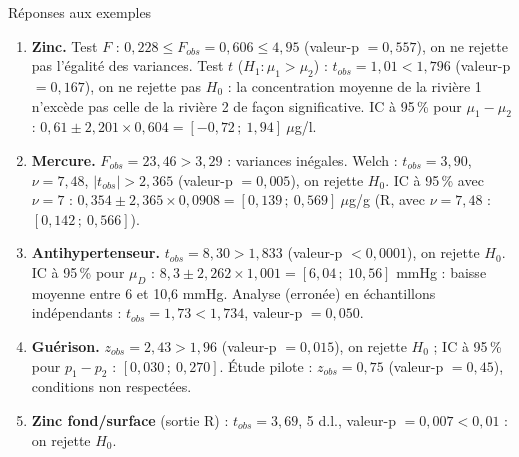 \documentclass{BeamerTemplate}
\begin{document}
\begin{frame}[t]{Réponses aux exemples}
  \footnotesize
  \begin{enumerate}\itemsep 1.5mm
    \item[1.] \textbf{Zinc.} Test $F$ : $0{,}228 \le F_{obs} = 0{,}606 \le 4{,}95$ (valeur-p $= 0{,}557$), on ne rejette pas l'égalité des variances.
      Test $t$ ($H_1: \mu_1 > \mu_2$) : $t_{obs} = 1{,}01 < 1{,}796$ (valeur-p $= 0{,}167$), on ne rejette pas $H_0$ : la concentration moyenne de la rivière 1 n'excède pas celle de la rivière 2 de façon significative.
      IC à 95\,\% pour $\mu_1 - \mu_2$ : $0{,}61 \pm 2{,}201 \times 0{,}604 = [-0{,}72\,;\ 1{,}94]\ \mu$g/l.
    \item[2.] \textbf{Mercure.} $F_{obs} = 23{,}46 > 3{,}29$ : variances inégales. Welch : $t_{obs} = 3{,}90$, $\nu = 7{,}48$, $|t_{obs}| > 2{,}365$ (valeur-p $= 0{,}005$), on rejette $H_0$.
      IC à 95\,\% avec $\nu = 7$ : $0{,}354 \pm 2{,}365 \times 0{,}0908 = [0{,}139\,;\ 0{,}569]\ \mu$g/g (R, avec $\nu = 7{,}48$ : $[0{,}142\,;\ 0{,}566]$).
    \item[3.] \textbf{Antihypertenseur.} $t_{obs} = 8{,}30 > 1{,}833$ (valeur-p $< 0{,}0001$), on rejette $H_0$.
      IC à 95\,\% pour $\mu_D$ : $8{,}3 \pm 2{,}262 \times 1{,}001 = [6{,}04\,;\ 10{,}56]$ mmHg : baisse moyenne entre 6 et 10,6 mmHg.
      Analyse (erronée) en échantillons indépendants : $t_{obs} = 1{,}73 < 1{,}734$, valeur-p $= 0{,}050$.
    \item[4.] \textbf{Guérison.} $z_{obs} = 2{,}43 > 1{,}96$ (valeur-p $= 0{,}015$), on rejette $H_0$ ; IC à 95\,\% pour $p_1 - p_2$ : $[0{,}030\,;\ 0{,}270]$.
      Étude pilote : $z_{obs} = 0{,}75$ (valeur-p $= 0{,}45$), conditions non respectées.
    \item[5.] \textbf{Zinc fond/surface} (sortie R) : $t_{obs} = 3{,}69$, 5 d.l., valeur-p $= 0{,}007 < 0{,}01$ : on rejette $H_0$.
  \end{enumerate}
\end{frame}
\end{document}

